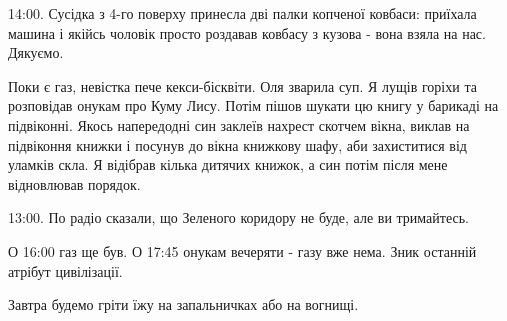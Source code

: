 14:00. Сусідка з 4-го поверху принесла дві палки копченої ковбаси: приїхала
машина і якійсь чоловік просто роздавав ковбасу з кузова - вона взяла на нас.
Дякуємо.

Поки є газ, невістка пече кекси-бісквіти. Оля зварила суп. Я лущів горіхи та
розповідав онукам про Куму Лису. Потім пішов шукати цю книгу у барикаді на
підвіконні. Якось напередодні син заклеїв нахрест скотчем вікна, виклав на
підвіконня книжки і посунув до вікна книжкову шафу, аби захиститися від уламків
скла. Я відібрав кілька дитячих книжок, а син потім після мене відновлював
порядок.

13:00. По радіо сказали, що Зеленого коридору не буде, але ви тримайтесь.

О 16:00 газ ще був. О 17:45 онукам вечеряти - газу вже нема. Зник останній
атрібут цивілізації.

Завтра будемо гріти їжу на запальничках або на вогнищі.

